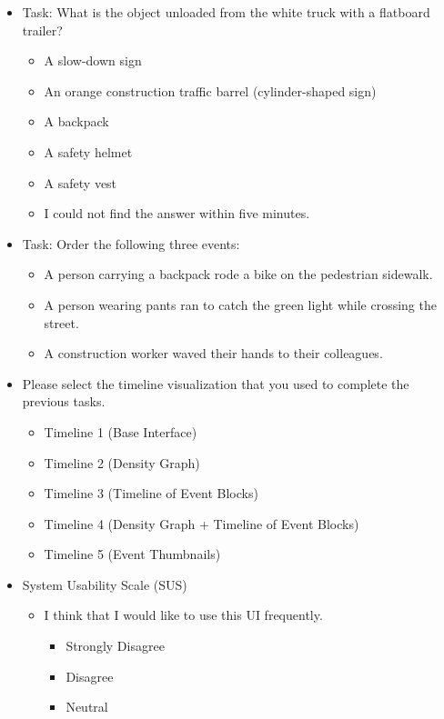 \documentclass[doublespace,draft,nopageskip]{VTthesis} %
\begin{document}
\begin{itemize}
    \item Task: What is the object unloaded from the white truck with a flatboard trailer?
    \begin{itemize}
        \item A slow-down sign
        \item An orange construction traffic barrel (cylinder-shaped sign)
        \item A backpack
        \item A safety helmet
        \item A safety vest
        \item I could not find the answer within five minutes.
    \end{itemize}
    \item Task: Order the following three events:
    \begin{itemize}
        \item A person carrying a backpack rode a bike on the pedestrian sidewalk.
        \item A person wearing pants ran to catch the green light while crossing the street.
        \item A construction worker waved their hands to their colleagues.
    \end{itemize}
    \item Please select the timeline visualization that you used to complete the previous tasks.
    \begin{itemize}
        \item Timeline 1 (Base Interface)
        \item Timeline 2 (Density Graph)
        \item Timeline 3 (Timeline of Event Blocks)
        \item Timeline 4 (Density Graph + Timeline of Event Blocks)
        \item Timeline 5 (Event Thumbnails)
    \end{itemize}
    \item System Usability Scale (SUS)
    \begin{itemize}
        \item I think that I would like to use this UI frequently.
            \begin{itemize}
                \item Strongly Disagree
                \item Disagree
                \item Neutral

\end{itemize}
\end{itemize}
\end{itemize}
\end{document}
